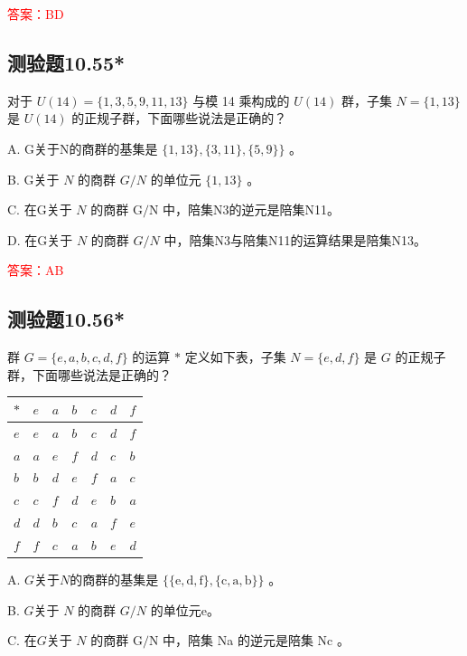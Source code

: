 \documentclass[UTF8, heading=true]{ctexart}
\begin{document}
\textcolor{red}{答案：BD}


\subsection{测验题10.55*}

对于 $U(14)=\{1,3,5,9,11,13\}$ 与模 14 乘构成的 $U(14)$ 群，子集 $N=\{1,13\}$ 是 $U(14)$ 的正规子群，下面哪些说法是正确的？

A. G关于N的商群的基集是 $\{1,13\},\{3,11\},\{5,9\}\}$ 。

B. G关于 $N$ 的商群 $G / N$ 的单位元 $\{1,13\}$ 。

C. 在G关于 $N$ 的商群 $\mathrm{G} / \mathrm{N}$ 中，陪集N3的逆元是陪集N11。

D. 在G关于 $N$ 的商群 $G / N$ 中，陪集N3与陪集N11的运算结果是陪集N13。

\textcolor{red}{答案：AB}

\subsection{测验题10.56*}

群 $G=\{e, a, b, c, d, f\}$ 的运算 $*$ 定义如下表，子集 $N=\{e, d, f\}$ 是 $G$ 的正规子群，下面哪些说法是正确的？

\begin{table}[H]
  \renewcommand{\arraystretch}{1.5}
  \centering
\begin{tabular}{l|llllll}
\hline$*$ & $e$ & $a$ & $b$ & $c$ & $d$ & $f$ \\
\hline$e$ & $e$ & $a$ & $b$ & $c$ & $d$ & $f$ \\
$a$ & $a$ & $e$ & $f$ & $d$ & $c$ & $b$ \\
$b$ & $b$ & $d$ & $e$ & $f$ & $a$ & $c$ \\
$c$ & $c$ & $f$ & $d$ & $e$ & $b$ & $a$ \\
$d$ & $d$ & $b$ & $c$ & $a$ & $f$ & $e$ \\
$f$ & $f$ & $c$ & $a$ & $b$ & $e$ & $d$ \\
\hline
\end{tabular}
\end{table}

A. $G$关于$N$的商群的基集是 $\{\{\mathrm{e}, \mathrm{d}, \mathrm{f}\},\{\mathrm{c}, \mathrm{a}, \mathrm{b}\}\}$ 。

B. $G$关于 $N$ 的商群 $G / N$ 的单位元e。

C. 在$G$关于 $N$ 的商群 $\mathrm{G} / \mathrm{N}$ 中，陪集 Na 的逆元是陪集 Nc 。
\end{document}
